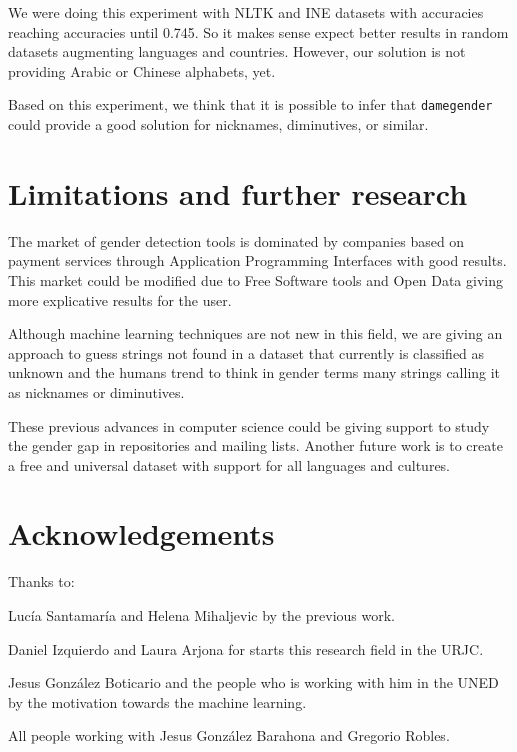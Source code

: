 \documentclass[a4paper]{article}
\begin{document}
We were doing this experiment with NLTK and INE datasets with accuracies reaching accuracies until 0.745.
So it makes sense expect better results in random datasets augmenting languages and countries.
However, our solution is not providing Arabic or Chinese alphabets, yet.

Based on this experiment, we think that it is possible to infer that \texttt{damegender} could provide a good solution for nicknames, diminutives, or similar.


\section{Limitations and further research}


The market of gender detection tools is dominated by companies based on payment services through Application Programming Interfaces with good results. 
This market could be modified due to Free Software tools and Open Data giving more explicative results for the user.

Although machine learning techniques are not new in this field, we are giving an approach to guess strings not found in a dataset that currently is classified as unknown and the humans trend to think in gender terms many strings calling it as nicknames or diminutives.

These previous advances in computer science could be giving support to study the gender gap in repositories and mailing lists.
Another future work is to create a free and universal dataset with support for all languages and cultures.


\section*{Acknowledgements}

Thanks to:

Lucía Santamaría and Helena Mihaljevic by the previous work.

Daniel Izquierdo and Laura Arjona for starts this research field in the URJC.

Jesus González Boticario and the people who is working with him in the UNED by the motivation towards the machine learning.

All people working with Jesus González Barahona and Gregorio Robles.

 

\end{document}
